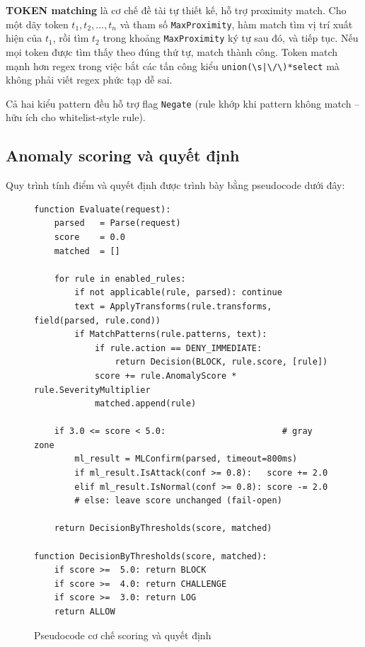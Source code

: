 \documentclass[../DoAn.tex]{subfiles}
\begin{document}
\textbf{TOKEN matching} là cơ chế đề tài tự thiết kế, hỗ trợ proximity
match. Cho một dãy token \(t_1, t_2, \ldots, t_n\) và tham số
\texttt{MaxProximity}, hàm match tìm vị trí xuất hiện của \(t_1\), rồi
tìm \(t_2\) trong khoảng \texttt{MaxProximity} ký tự sau đó, và tiếp tục.
Nếu mọi token được tìm thấy theo đúng thứ tự, match thành công. Token match
mạnh hơn regex trong việc bắt các tấn công kiểu \texttt{union(\textbackslash s|\textbackslash /\textbackslash *)*select}
mà không phải viết regex phức tạp dễ sai.

Cả hai kiểu pattern đều hỗ trợ flag \texttt{Negate} (rule khớp khi pattern
không match -- hữu ích cho whitelist-style rule).

\subsection{Anomaly scoring và quyết định}
\label{subsection:4.2.4}

Quy trình tính điểm và quyết định được trình bày bằng pseudocode dưới đây:

\begin{figure}[h!]
\centering
\begin{lstlisting}[style=thesis,numbers=none,basicstyle=\ttfamily\footnotesize]
function Evaluate(request):
    parsed   = Parse(request)
    score    = 0.0
    matched  = []

    for rule in enabled_rules:
        if not applicable(rule, parsed): continue
        text = ApplyTransforms(rule.transforms, field(parsed, rule.cond))
        if MatchPatterns(rule.patterns, text):
            if rule.action == DENY_IMMEDIATE:
                return Decision(BLOCK, rule.score, [rule])
            score += rule.AnomalyScore * rule.SeverityMultiplier
            matched.append(rule)

    if 3.0 <= score < 5.0:                       # gray zone
        ml_result = MLConfirm(parsed, timeout=800ms)
        if ml_result.IsAttack(conf >= 0.8):   score += 2.0
        elif ml_result.IsNormal(conf >= 0.8): score -= 2.0
        # else: leave score unchanged (fail-open)

    return DecisionByThresholds(score, matched)

function DecisionByThresholds(score, matched):
    if score >=  5.0: return BLOCK
    if score >=  4.0: return CHALLENGE
    if score >=  3.0: return LOG
    return ALLOW
\end{lstlisting}
\caption{Pseudocode cơ chế scoring và quyết định}
\label{fig:scoring-pseudo}
\end{figure}
\end{document}
